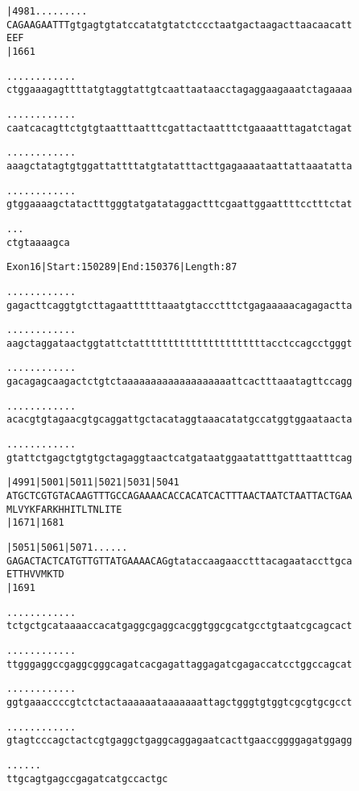 \documentclass{article}
\begin{document}
\begin{alltt}
     |4981     .    .    .    .    .    .    .    .    .    
CAGAAGAATTTgtgagtgtatccatatgtatctccctaatgactaagacttaacaacatt
  E  E  F                                                   
     |1661                                                  

.    .    .    .    .    .    .    .    .    .    .    .    
ctggaaagagttttatgtaggtattgtcaattaataacctagaggaagaaatctagaaaa

.    .    .    .    .    .    .    .    .    .    .    .    
caatcacagttctgtgtaatttaatttcgattactaatttctgaaaatttagatctagat

.    .    .    .    .    .    .    .    .    .    .    .    
aaagctatagtgtggattattttatgtatatttacttgagaaaataattattaaatatta

.    .    .    .    .    .    .    .    .    .    .    .    
gtggaaaagctatactttgggtatgatataggactttcgaattggaattttcctttctat

.    .    .
ctgtaaaagca
\end{alltt}
\newpage
\begin{alltt}
Exon 16 | Start: 150289 | End: 150376 | Length: 87

.    .    .    .    .    .    .    .    .    .    .    .    
gagacttcaggtgtcttagaattttttaaatgtaccctttctgagaaaaacagagactta

.    .    .    .    .    .    .    .    .    .    .    .    
aagctaggataactggtattctattttttttttttttttttttttacctccagcctgggt

.    .    .    .    .    .    .    .    .    .    .    .    
gacagagcaagactctgtctaaaaaaaaaaaaaaaaaaattcactttaaatagttccagg

.    .    .    .    .    .    .    .    .    .    .    .    
acacgtgtagaacgtgcaggattgctacataggtaaacatatgccatggtggaataacta

.    .    .    .    .    .    .    .    .    .    .    .    
gtattctgagctgtgtgctagaggtaactcatgataatggaatatttgatttaatttcag

    |4991     |5001     |5011     |5021     |5031     |5041 
ATGCTCGTGTACAAGTTTGCCAGAAAACACCACATCACTTTAACTAATCTAATTACTGAA
M  L  V  Y  K  F  A  R  K  H  H  I  T  L  T  N  L  I  T  E  
                        |1671                         |1681 

    |5051     |5061     |5071   .    .    .    .    .    .  
GAGACTACTCATGTTGTTATGAAAACAGgtataccaagaacctttacagaataccttgca
E  T  T  H  V  V  M  K  T  D                                
                        |1691                               

  .    .    .    .    .    .    .    .    .    .    .    .  
tctgctgcataaaaccacatgaggcgaggcacggtggcgcatgcctgtaatcgcagcact

  .    .    .    .    .    .    .    .    .    .    .    .  
ttgggaggccgaggcgggcagatcacgagattaggagatcgagaccatcctggccagcat

  .    .    .    .    .    .    .    .    .    .    .    .  
ggtgaaaccccgtctctactaaaaaataaaaaaattagctgggtgtggtcgcgtgcgcct

  .    .    .    .    .    .    .    .    .    .    .    .  
gtagtcccagctactcgtgaggctgaggcaggagaatcacttgaaccggggagatggagg

  .    .    .    .    .    .
ttgcagtgagccgagatcatgccactgc
\end{alltt}
\end{document}
